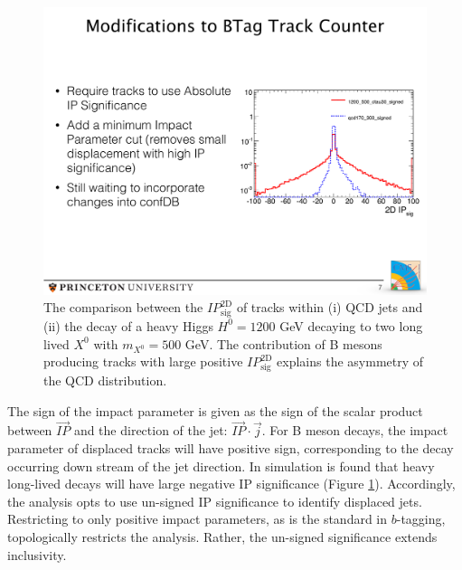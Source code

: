 \begin{figure}
\begin{center}
\includegraphics[width=.7\textwidth]{figures/an_jetid/signed_2dipsig}
\end{center}
\caption{The comparison between the $IP_{\textrm{sig}}^{\textrm{2D}}$ of tracks within (i) QCD jets and (ii) the decay of a
 heavy Higgs $H^0=1200$ GeV decaying to two long lived
$X^{0}$ with $m_{X^0}=500$ GeV. The contribution of B mesons producing tracks 
with large positive $IP_{\textrm{sig}}^{\textrm{2D}}$ explains the asymmetry of the QCD distribution.}
\label{fig:2dipsig_sign}
\end{figure}
The sign of the impact parameter is given as the sign of the scalar product between $\vec{IP}$ and  the direction of the jet: $\vec{IP} \cdot \vec j$. 
For B meson decays, the impact parameter of displaced tracks will have positive sign, corresponding to the decay occurring down stream of the jet direction. In simulation is found that heavy long-lived
decays will have large negative IP significance (Figure \ref{fig:2dipsig_sign}). 
Accordingly, the analysis opts to use un-signed IP significance to 
identify displaced jets. Restricting to only positive
impact parameters, as is the standard in $b$-tagging, topologically restricts
 the analysis. Rather, the un-signed significance extends inclusivity. 


